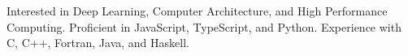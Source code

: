 \begin{cvparagraph}
Interested in Deep Learning, Computer Architecture, and High Performance Computing. Proficient in JavaScript, TypeScript, and Python. Experience with C, C++, Fortran, Java, and Haskell.
\end{cvparagraph}
